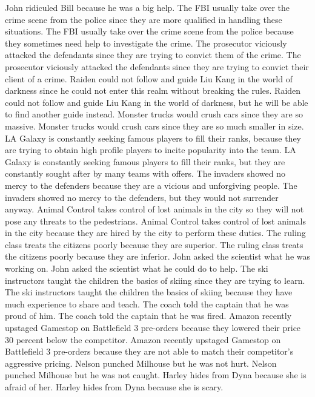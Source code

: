 \documentclass{article}
\begin{document}
\begin{enumerate}
	John ridiculed Bill because he was a big help.
	The FBI usually take over the crime scene from the police since they are more qualified in handling these situations.
	The FBI usually take over the crime scene from the police because they sometimes need help to investigate the crime.
	The prosecutor viciously attacked the defendants since they are trying to convict them of the crime.
	The prosecutor viciously attacked the defendants since they are trying to convict their client of a crime.
	Raiden could not follow and guide Liu Kang in the world of darkness since he could not enter this realm without breaking the rules.
	Raiden could not follow and guide Liu Kang in the world of darkness, but he will be able to find another guide instead.
	Monster trucks would crush cars since they are so massive.
	Monster trucks would crush cars since they are so much smaller in size.
	LA Galaxy is constantly seeking famous players to fill their ranks, because they are trying to obtain high profile players to incite popularity into the team.
	LA Galaxy is constantly seeking famous players to fill their ranks, but they are constantly sought after by many teams with offers.
	The invaders showed no mercy to the defenders because they are a vicious and unforgiving people.
	The invaders showed no mercy to the defenders, but they would not surrender anyway.
	Animal Control takes control of lost animals in the city so they will not pose any threats to the pedestrians.
	Animal Control takes control of lost animals in the city because they are hired by the city to perform these duties.
	The ruling class treats the citizens poorly because they are superior.
	The ruling class treats the citizens poorly because they are inferior.
	John asked the scientist what he was working on.
	John asked the scientist what he could do to help.
	The ski instructors taught the children the basics of skiing since they are trying to learn.
	The ski instructors taught the children the basics of skiing because they have much experience to share and teach.
	The coach told the captain that he was proud of him.
	The coach told the captain that he was fired.
	Amazon recently upstaged Gamestop on Battlefield 3 pre-orders because they lowered their price 30 percent below the competitor.
	Amazon recently upstaged Gamestop on Battlefield 3 pre-orders because they are not able to match their competitor's aggressive pricing.
	Nelson punched Milhouse but he was not hurt.
	Nelson punched Milhouse but he was not caught.
	Harley hides from Dyna because she is afraid of her.
	Harley hides from Dyna because she is scary.

\end{enumerate}
\end{document}
